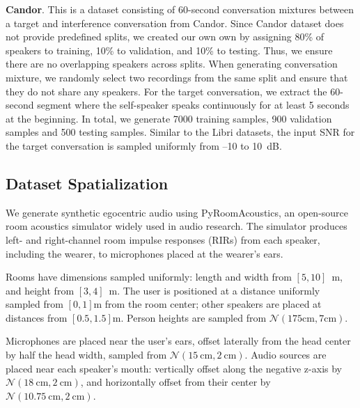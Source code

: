 \vskip 0.02in\noindent\textbf{Candor}. {This is a dataset consisting of 60-second conversation mixtures between a target and interference conversation from Candor. Since Candor dataset does not provide predefined splits, we created our own own by assigning 80\% of speakers to training, 10\% to validation, and 10\% to testing. Thus, we ensure there are no overlapping speakers across splits. When generating conversation mixture, we randomly select two recordings from the same split and ensure that they do not share any speakers. For the target conversation, we extract the 60-second segment where the self-speaker speaks continuously for at least 5 seconds at the beginning. In total, we generate 7000 training samples, 900 validation samples and 500 testing samples. Similar to the Libri datasets, the input SNR for the target conversation is sampled uniformly from –10 to 10~dB.}




\subsection{Dataset Spatialization}\label{sec:spatialize}

We generate synthetic egocentric audio using PyRoomAcoustics, an open-source room acoustics simulator widely used in audio research. The simulator produces left- and right-channel room impulse responses (RIRs) from each speaker, including the wearer, to microphones placed at the wearer’s ears.

Rooms have dimensions sampled uniformly: length and width from $[5, 10]$~m, and height from $[3, 4]$~m. The user is positioned at a distance uniformly sampled from $[0, 1]$m from the room center; other speakers are placed at distances from $[0.5, 1.5]$m. Person heights are sampled from $\mathcal{N}(175\text{cm}, 7\text{cm})$.

Microphones are placed near the user’s ears, offset laterally from the head center by half the head width, sampled from $\mathcal{N}(15~\text{cm}, 2~\text{cm})$. Audio sources are placed near each speaker’s mouth: vertically offset along the negative z-axis by $\mathcal{N}(18~\text{cm}, 2~\text{cm})$, and horizontally offset from their center by $\mathcal{N}(10.75~\text{cm}, 2~\text{cm})$.

